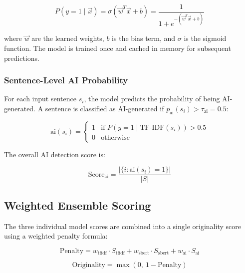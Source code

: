\documentclass[conference]{IEEEtran}
\begin{document}
\begin{equation}
P(y = 1 \mid \vec{x}) = \sigma(\vec{w}^T \vec{x} + b) = \frac{1}{1 + e^{-(\vec{w}^T \vec{x} + b)}}
\label{eq_logistic}
\end{equation}

\noindent where $\vec{w}$ are the learned weights, $b$ is the bias term, and $\sigma$ is the sigmoid function. The model is trained once and cached in memory for subsequent predictions.

\subsubsection{Sentence-Level AI Probability}

For each input sentence $s_i$, the model predicts the probability of being AI-generated. A sentence is classified as AI-generated if $p_{\text{ai}}(s_i) > \tau_{\text{ai}} = 0.5$:

\begin{equation}
\text{ai}(s_i) = \begin{cases} 1 & \text{if } P(y=1 \mid \text{TF-IDF}(s_i)) > 0.5 \\ 0 & \text{otherwise} \end{cases}
\label{eq_ai}
\end{equation}

\noindent The overall AI detection score is:

\begin{equation}
\text{Score}_{\text{ai}} = \frac{|\{i : \text{ai}(s_i) = 1\}|}{|S|}
\label{eq_ai_score}
\end{equation}

\subsection{Weighted Ensemble Scoring}

The three individual model scores are combined into a single originality score using a weighted penalty formula:

\begin{equation}
\text{Penalty} = w_{\text{tfidf}} \cdot S_{\text{tfidf}} + w_{\text{sbert}} \cdot S_{\text{sbert}} + w_{\text{ai}} \cdot S_{\text{ai}}
\label{eq_penalty}
\end{equation}

\begin{equation}
\text{Originality} = \max(0,\ 1 - \text{Penalty})
\label{eq_originality}
\end{equation}
\end{document}
